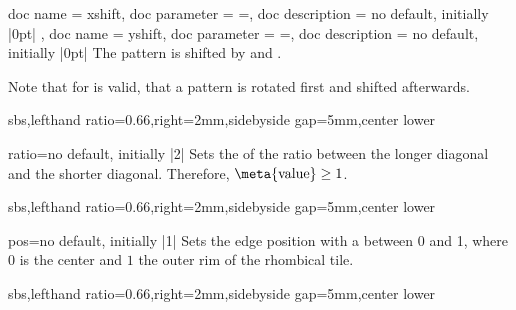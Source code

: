 \documentclass[a4paper,11pt]{article}
\begin{document}
\begin{docPatternKeys}
  {
    {
      doc name        = xshift,
      doc parameter   = {=},
      doc description = {no default, initially |0pt|}
    },
    {
      doc name        = yshift,
      doc parameter   = {=},
      doc description = {no default, initially |0pt|}
    }
  }
  The pattern is shifted by  and .
  \par
  Note that for  is valid, that a pattern is rotated first and shifted afterwards.
\begin{dispExample*}{sbs,lefthand ratio=0.66,right=2mm,sidebyside gap=5mm,center lower}
\end{dispExample*}
\end{docPatternKeys}



\begin{docPatternKey}{ratio}{=}{no default, initially |2|}
  Sets the  of the ratio
  between the longer diagonal and the shorter diagonal.
  Therefore, $\text{\meta{value}}\ge 1$.

\begin{dispExample*}{sbs,lefthand ratio=0.66,right=2mm,sidebyside gap=5mm,center lower}
\end{dispExample*}
\end{docPatternKey}



\begin{docPatternKey}{pos}{=}{no default, initially |1|}
  Sets the edge position with a  between 0 and 1, where $0$ is
  the center and $1$ the outer rim of the rhombical tile.

\begin{dispExample*}{sbs,lefthand ratio=0.66,right=2mm,sidebyside gap=5mm,center lower}
\end{dispExample*}
\end{docPatternKey}
\end{document}
